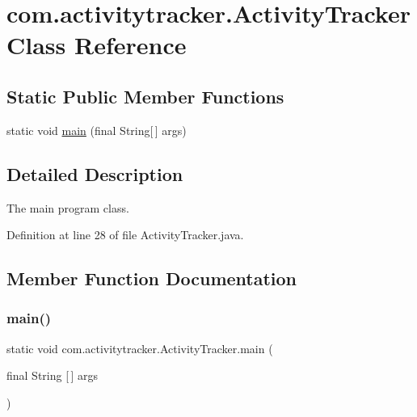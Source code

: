 \hypertarget{classcom_1_1activitytracker_1_1_activity_tracker}{}\section{com.\+activitytracker.\+Activity\+Tracker Class Reference}
\label{classcom_1_1activitytracker_1_1_activity_tracker}
\subsection*{Static Public Member Functions}
\begin{DoxyCompactItemize}
\item 
static void \mbox{\hyperlink{classcom_1_1activitytracker_1_1_activity_tracker_a29cfd2975a07afe34e2a3112cbf32dc8}{main}} (final String\mbox{[}$\,$\mbox{]} args)
\end{DoxyCompactItemize}


\subsection{Detailed Description}
The main program class. 

Definition at line 28 of file Activity\+Tracker.\+java.



\subsection{Member Function Documentation}
\mbox{\label{classcom_1_1activitytracker_1_1_activity_tracker_a29cfd2975a07afe34e2a3112cbf32dc8}} 
\subsubsection{\texorpdfstring{main()}{main()}}
{\footnotesize\ttfamily static void com.\+activitytracker.\+Activity\+Tracker.\+main (\begin{DoxyParamCaption}\item[{final String \mbox{[}$\,$\mbox{]}}]{args }\end{DoxyParamCaption})\hspace{0.3cm}{\ttfamily [static]}}

